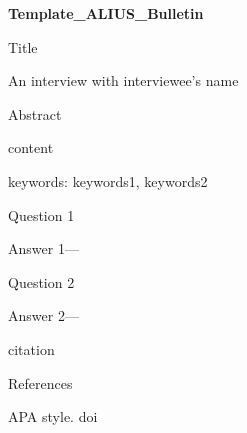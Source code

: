 \documentclass[11pt]{article}
\begin{document}
{\LARGE\bfseries Template\_ALIUS\_Bulletin\par}
\vspace{1em}
Title\par

An interview with interviewee’s name\par

Abstract\par

content\par

keywords: keywords1, keywords2		

Question 1\par

Answer 1—\par

Question 2\par

Answer 2—\par

citation\par

References\par

APA style. doi\par
\end{document}
